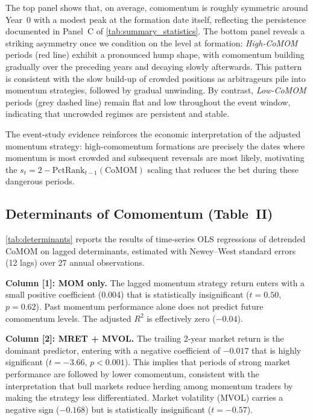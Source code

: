 \documentclass[10pt]{article}
\begin{document}
The top panel shows that, on average, comomentum is roughly symmetric around Year~0 with a modest peak at the formation date itself, reflecting the persistence documented in Panel~C of \autoref{tab:summary_statistics}. The bottom panel reveals a striking asymmetry once we condition on the level at formation: \emph{High-CoMOM} periods (red line) exhibit a pronounced hump shape, with comomentum building gradually over the preceding years and decaying slowly afterwards. This pattern is consistent with the slow build-up of crowded positions as arbitrageurs pile into momentum strategies, followed by gradual unwinding. By contrast, \emph{Low-CoMOM} periods (grey dashed line) remain flat and low throughout the event window, indicating that uncrowded regimes are persistent and stable.

The event-study evidence reinforces the economic interpretation of the adjusted momentum strategy: high-comomentum formations are precisely the dates where momentum is most crowded and subsequent reversals are most likely, motivating the $s_t = 2 - \text{PctRank}_{t-1}(\text{CoMOM})$ scaling that reduces the bet during these dangerous periods.


\subsection{Determinants of Comomentum (Table~II)}

\autoref{tab:determinants} reports the results of time-series OLS regressions of detrended CoMOM on lagged determinants, estimated with Newey--West standard errors (12 lags) over 27 annual observations.



\textbf{Column [1]: MOM only.} The lagged momentum strategy return enters with a small positive coefficient (0.004) that is statistically insignificant ($t = 0.50$, $p = 0.62$). Past momentum performance alone does not predict future comomentum levels. The adjusted $R^2$ is effectively zero ($-0.04$).

\textbf{Column [2]: MRET + MVOL.} The trailing 2-year market return is the dominant predictor, entering with a negative coefficient of $-0.017$ that is highly significant ($t = -3.66$, $p < 0.001$). This implies that periods of strong market performance are followed by lower comomentum, consistent with the interpretation that bull markets reduce herding among momentum traders by making the strategy less differentiated. Market volatility (MVOL) carries a negative sign ($-0.168$) but is statistically insignificant ($t = -0.57$).
\end{document}
